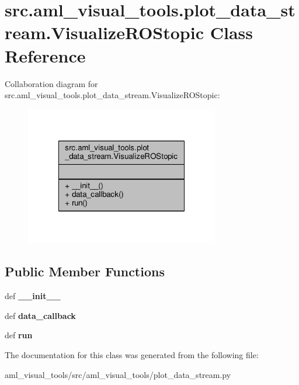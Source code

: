 \hypertarget{classsrc_1_1aml__visual__tools_1_1plot__data__stream_1_1_visualize_r_o_stopic}{\section{src.\-aml\-\_\-visual\-\_\-tools.\-plot\-\_\-data\-\_\-stream.\-Visualize\-R\-O\-Stopic Class Reference}
\label{classsrc_1_1aml__visual__tools_1_1plot__data__stream_1_1_visualize_r_o_stopic}
}


Collaboration diagram for src.\-aml\-\_\-visual\-\_\-tools.\-plot\-\_\-data\-\_\-stream.\-Visualize\-R\-O\-Stopic\-:\nopagebreak
\begin{figure}[H]
\begin{center}
\leavevmode
\includegraphics[width=240pt]{classsrc_1_1aml__visual__tools_1_1plot__data__stream_1_1_visualize_r_o_stopic__coll__graph}
\end{center}
\end{figure}
\subsection*{Public Member Functions}
\begin{DoxyCompactItemize}
\item 
\hypertarget{classsrc_1_1aml__visual__tools_1_1plot__data__stream_1_1_visualize_r_o_stopic_a564cdf3ec352ccbaaf5726158c1425d2}{def {\bfseries \-\_\-\-\_\-init\-\_\-\-\_\-}}\label{classsrc_1_1aml__visual__tools_1_1plot__data__stream_1_1_visualize_r_o_stopic_a564cdf3ec352ccbaaf5726158c1425d2}

\item 
\hypertarget{classsrc_1_1aml__visual__tools_1_1plot__data__stream_1_1_visualize_r_o_stopic_aa5f9be3fe7ae2b783d60f292e4b52457}{def {\bfseries data\-\_\-callback}}\label{classsrc_1_1aml__visual__tools_1_1plot__data__stream_1_1_visualize_r_o_stopic_aa5f9be3fe7ae2b783d60f292e4b52457}

\item 
\hypertarget{classsrc_1_1aml__visual__tools_1_1plot__data__stream_1_1_visualize_r_o_stopic_aab9507ea416f36ea6b51fbf2b5a1c424}{def {\bfseries run}}\label{classsrc_1_1aml__visual__tools_1_1plot__data__stream_1_1_visualize_r_o_stopic_aab9507ea416f36ea6b51fbf2b5a1c424}

\end{DoxyCompactItemize}


The documentation for this class was generated from the following file\-:\begin{DoxyCompactItemize}
\item 
aml\-\_\-visual\-\_\-tools/src/aml\-\_\-visual\-\_\-tools/plot\-\_\-data\-\_\-stream.\-py\end{DoxyCompactItemize}
